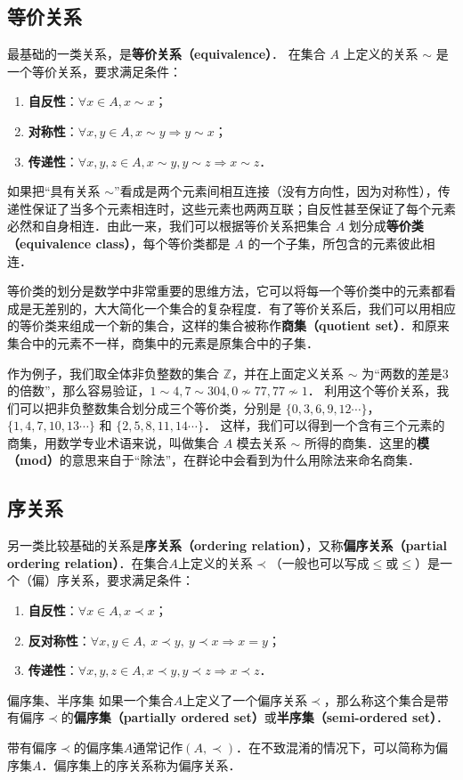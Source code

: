 \subsection{等价关系}
最基础的一类关系，是\textbf{等价关系（equivalence）}． 在集合 $A$ 上定义的关系 $\sim$ 是一个等价关系，要求满足条件：
\begin{enumerate}
\item \textbf{自反性}：$\forall x\in A, x\sim x$；
\item \textbf{对称性}：$\forall x, y\in A, x\sim y \Rightarrow y\sim x$；
\item \textbf{传递性}：$\forall x, y, z\in A, x\sim y, y\sim z\Rightarrow x\sim z$．
\end{enumerate}
如果把“具有关系 $\sim$”看成是两个元素间相互连接（没有方向性，因为对称性），传递性保证了当多个元素相连时，这些元素也两两互联；自反性甚至保证了每个元素必然和自身相连．由此一来，我们可以根据等价关系把集合 $A$ 划分成\textbf{等价类（equivalence class）}，每个等价类都是 $A$ 的一个子集，所包含的元素彼此相连．

等价类的划分是数学中非常重要的思维方法，它可以将每一个等价类中的元素都看成是无差别的，大大简化一个集合的复杂程度．有了等价关系后，我们可以用相应的等价类来组成一个新的集合，这样的集合被称作\textbf{商集（quotient set）}．和原来集合中的元素不一样，商集中的元素是原集合中的子集．

作为例子，我们取全体非负整数的集合 $\mathbb{Z}$，并在上面定义关系 $\sim$ 为“两数的差是3的倍数”，那么容易验证，$1\sim4, 7\sim304, 0\not\sim 77, 77\not\sim 1$． 利用这个等价关系，我们可以把非负整数集合划分成三个等价类，分别是 $\{0, 3, 6, 9, 12\cdots \}$，$\{1, 4, 7, 10, 13\cdots\}$ 和 $\{2, 5, 8, 11, 14\cdots\}$． 这样，我们可以得到一个含有三个元素的商集，用数学专业术语来说，叫做集合 $A$ 模去关系 $\sim$ 所得的商集．这里的\textbf{模（mod）}的意思来自于“除法”，在群论中会看到为什么用除法来命名商集．

\subsection{序关系}
另一类比较基础的关系是\textbf{序关系（ordering relation）}，又称\textbf{偏序关系（partial ordering relation）}．在集合$A$上定义的关系$\prec$（一般也可以写成$\leq$或$\leqslant$）是一个（偏）序关系，要求满足条件：
\begin{enumerate}
\item \textbf{自反性}：$\forall x\in A,x\prec x$；
\item \textbf{反对称性}：$\forall x,y\in A,\ x\prec y,\ y\prec x \Rightarrow x = y $；
\item \textbf{传递性}：$\forall x,y,z\in A,x\prec y,y\prec z \Rightarrow x\prec z $．
\end{enumerate}

\begin{definition}{偏序集、半序集}
如果一个集合$A$上定义了一个偏序关系$\prec$，那么称这个集合是带有偏序$\prec$的\textbf{偏序集（partially ordered set）}或\textbf{半序集（semi-ordered set）}．
\end{definition}

带有偏序$\prec$的偏序集$A$通常记作$(A,\prec)$．在不致混淆的情况下，可以简称为偏序集$A$．偏序集上的序关系称为偏序关系．